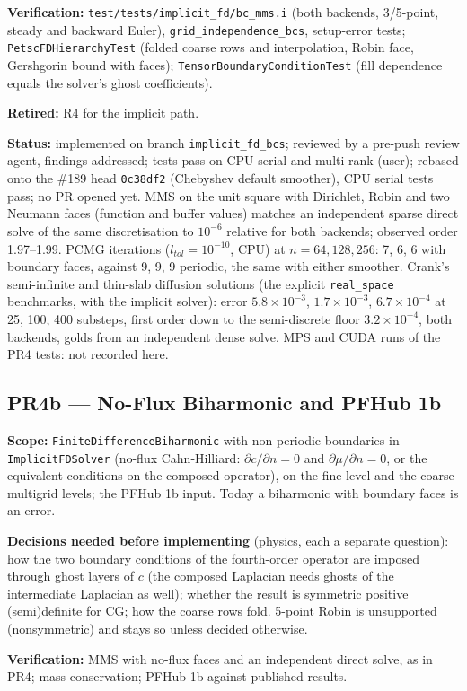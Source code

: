 \documentclass[11pt]{article}
\newcommand{\pr}[2]{\subsection{PR#1 --- #2}}
\newcommand{\status}[1]{\textcolor{marlinteal}{\textbf{Status:}} #1}
\begin{document}
\textbf{Verification:} \texttt{test/tests/implicit\_fd/bc\_mms.i} (both
backends, 3/5-point, steady and backward Euler),
\texttt{grid\_independence\_bcs}, setup-error tests;
\texttt{PetscFDHierarchyTest} (folded coarse rows and interpolation, Robin
face, Gershgorin bound with faces); \texttt{TensorBoundaryConditionTest}
(fill dependence equals the solver's ghost coefficients).

\textbf{Retired:} R4 for the implicit path.

\status{implemented on branch \texttt{implicit\_fd\_bcs}; reviewed by a pre-push review agent,
findings addressed; tests pass on CPU serial and multi-rank (user); rebased onto the
\#189 head \texttt{0c38df2} (Chebyshev default smoother), CPU serial tests pass; no PR opened yet. MMS on the unit square with Dirichlet, Robin and two Neumann faces (function and
buffer values) matches an independent sparse direct solve of the same discretisation to
$10^{-6}$ relative for both backends; observed order 1.97--1.99. PCMG iterations
($l_{tol}=10^{-10}$, CPU) at $n = 64, 128, 256$: 7, 6, 6 with boundary faces, against 9, 9, 9
periodic, the same with either smoother. Crank's semi-infinite and thin-slab diffusion
solutions (the explicit \texttt{real\_space} benchmarks, with the implicit solver): error
$5.8\times10^{-3}$, $1.7\times10^{-3}$, $6.7\times10^{-4}$ at 25, 100, 400 substeps, first order
down to the semi-discrete floor $3.2\times10^{-4}$, both backends, golds from an independent
dense solve. MPS and CUDA runs of the PR4 tests: not recorded here.}

\pr{4b}{No-Flux Biharmonic and PFHub 1b}
\textbf{Scope:} \texttt{FiniteDifferenceBiharmonic} with non-periodic
boundaries in \texttt{ImplicitFDSolver} (no-flux Cahn-Hilliard:
$\partial c/\partial n = 0$ and $\partial \mu/\partial n = 0$, or the
equivalent conditions on the composed operator), on the fine level and the
coarse multigrid levels; the PFHub 1b input. Today a biharmonic with boundary
faces is an error.

\textbf{Decisions needed before implementing} (physics, each a separate
question): how the two boundary conditions of the fourth-order operator are
imposed through ghost layers of $c$ (the composed Laplacian needs ghosts of
the intermediate Laplacian as well); whether the result is symmetric
positive (semi)definite for CG; how the coarse rows fold. 5-point Robin is
unsupported (nonsymmetric) and stays so unless decided otherwise.

\textbf{Verification:} MMS with no-flux faces and an independent direct
solve, as in PR4; mass conservation; PFHub 1b against published results.
\end{document}

